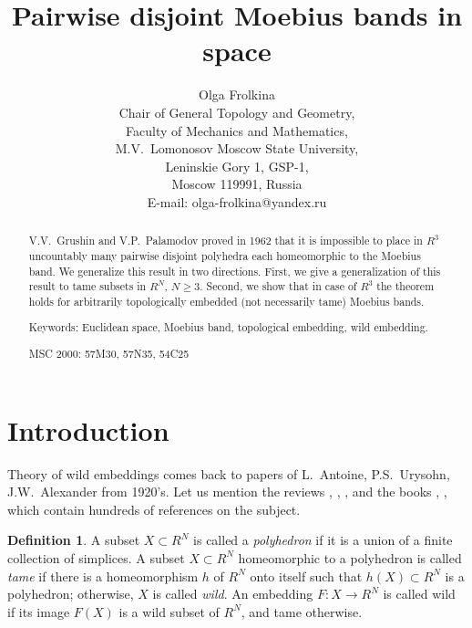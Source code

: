 \documentclass[12pt]{article}
\theoremstyle{definition}
\newtheorem{definition}[theorem]{Definition}
\begin{document}

\title{Pairwise disjoint Moebius bands in space}

\author{Olga Frolkina\\
Chair of General Topology and Geometry,\\
Faculty of Mechanics and Mathematics,\\
M.V.~Lomonosov Moscow State University,\\
Leninskie Gory 1, GSP-1,\\
Moscow 119991, Russia\\
E-mail: olga-frolkina@yandex.ru
}


\bigskip


\maketitle


\def\conv{\operatorname{conv}}
\def\Int{\operatorname{Int}}
\def\id{\operatorname{id}}


\begin{abstract}
V.V.~Grushin and V.P.~Palamodov proved in
1962 that it is impossible
to place in $R^3$
uncountably many
pairwise disjoint polyhedra
each homeomorphic to the Moebius band.
We generalize this result in two directions.
First, we give a generalization of this result to tame subsets in $R^N$, $N\geqslant 3$.
Second, we show that in case of $R^3$ the theorem holds
for arbitrarily topologically embedded 
(not necessarily tame)
Moebius bands.

Keywords: Euclidean space, Moebius band,
topological embedding,
wild embedding.


MSC 2000: 57M30, 57N35, 54C25
\end{abstract}




\section{Introduction}


Theory of wild embeddings comes back
to papers of L.~Antoine, P.S.~Urysohn,
J.W.~Alexander 
from 1920's.
Let us mention
the reviews
\cite{BC}, \cite{Burgess-75}, \cite{Cernavsky}, \cite{Daverman}
and the
books \cite{DV}, \cite{Keldysh}, \cite{Rushing}
which
contain hundreds of references on the subject.

\begin{definition}
A subset $X\subset R^N$ is called a {\it polyhedron}
if it is a union of a finite collection of 
simplices.
A subset $X\subset R^N$ homeomorphic to a polyhedron
is called {\it tame}
if there is a homeomorphism $h$ of
$R^N$ onto itself such that
$h(X) \subset R^N$ is a polyhedron;
otherwise, $X$ is called {\it wild}.
An embedding $F:X\to R^N$ is called wild
if its image $F(X)$ is a wild subset of $R^N$,
and tame otherwise.
\end{definition}
\end{document}
